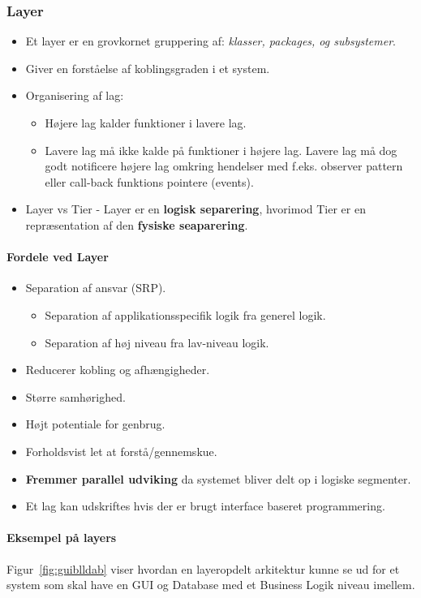 \subsubsection{Layer}
\begin{itemize}
	\item Et layer er en grovkornet gruppering af: \textit{klasser, packages, og subsystemer}.
	\item Giver en forståelse af koblingsgraden i et system.
	\item Organisering af lag:
	\begin{itemize}
		\item Højere lag kalder funktioner i lavere lag.
		\item Lavere lag må ikke kalde på funktioner i højere lag. Lavere lag må dog godt notificere højere lag omkring hendelser med f.eks. observer pattern eller call-back funktions pointere (events).
	\end{itemize}
	\item Layer vs Tier - Layer er en \textbf{logisk separering}, hvorimod Tier er en repræsentation af den \textbf{fysiske seaparering}.
\end{itemize}

\paragraph{Fordele ved Layer}
\begin{itemize}
	\item Separation af ansvar (SRP).
	\begin{itemize}
		\item Separation af applikationsspecifik logik fra generel logik.
		\item Separation af høj niveau fra lav-niveau logik.
	\end{itemize}
	\item Reducerer kobling og afhængigheder.
	\item Større samhørighed.
	\item Højt potentiale for genbrug.
	\item Forholdsvist let at forstå/gennemskue.
	\item \textbf{Fremmer parallel udviking} da systemet bliver delt op i logiske segmenter.
	\item Et lag kan udskriftes hvis der er brugt interface baseret programmering.
\end{itemize}

\paragraph{Eksempel på layers}
Figur~\ref{fig:guiblldab} viser hvordan en layeropdelt arkitektur kunne se ud for et system som skal have en GUI og Database med et Business Logik niveau imellem.

